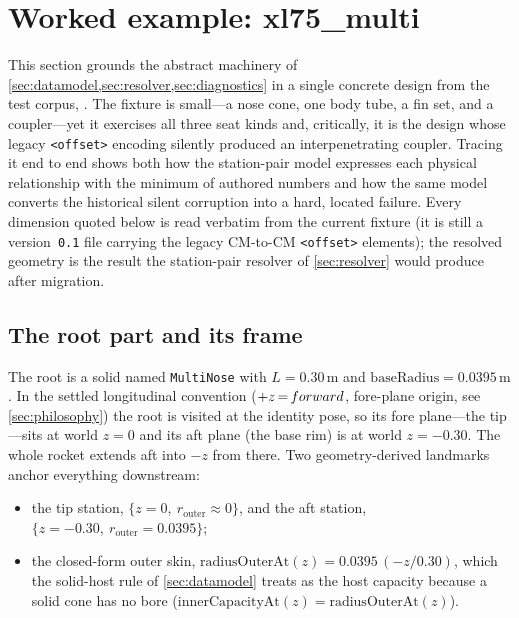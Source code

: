 \section{Worked example: xl75\_multi}\label{sec:worked}

This section grounds the abstract machinery of \cref{sec:datamodel,sec:resolver,sec:diagnostics}
in a single concrete design from the test corpus,
. The fixture is small---a nose cone, one body
tube, a fin set, and a coupler---yet it exercises all three seat kinds and, critically, it
is the design whose legacy \texttt{<offset>} encoding silently produced an interpenetrating
coupler. Tracing it end to end shows both how the station-pair model expresses each physical
relationship with the minimum of authored numbers and how the same model converts the
historical silent corruption into a hard, located failure. Every dimension quoted below is
read verbatim from the current fixture (it is still a version~\texttt{0.1} file carrying the
legacy CM-to-CM \texttt{<offset>} elements); the resolved geometry is the result the
station-pair resolver of \cref{sec:resolver} would produce after migration.

\subsection*{The root part and its frame}

The root is a solid  named \texttt{MultiNose} with $L = 0.30\,\text{m}$
and $\text{baseRadius} = 0.0395\,\text{m}$. In the settled longitudinal convention
($\zfwd$, fore-plane origin, see \cref{sec:philosophy}) the root is visited at the identity
pose, so its fore plane---the tip---sits at world $z = 0$ and its aft plane (the base rim) is at
world $z = -0.30$. The whole rocket extends aft into $-z$ from there. Two geometry-derived
landmarks anchor everything downstream:

\begin{itemize}
  \item the tip station, $\{z = 0,\ r_{\text{outer}} \approx 0\}$, and the aft station,
        $\{z = -0.30,\ r_{\text{outer}} = 0.0395\}$;
  \item the closed-form outer skin, $\text{radiusOuterAt}(z) = 0.0395\,(-z/0.30)$, which
        the solid-host rule of \cref{sec:datamodel} treats as the host capacity because a
        solid cone has no bore ($\text{innerCapacityAt}(z) = \text{radiusOuterAt}(z)$).
\end{itemize}

